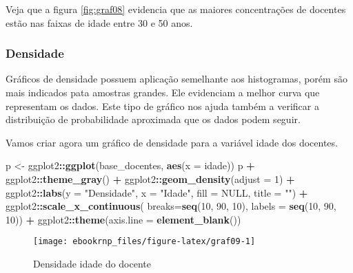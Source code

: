 \documentclass[11pt,]{style/krantz}
\makeatletter
\newenvironment{Shaded}{\begin{snugshade}}{\end{snugshade}}
\newcommand{\DataTypeTok}[1]{\textcolor[rgb]{0.13,0.29,0.53}{#1}}
\newcommand{\DecValTok}[1]{\textcolor[rgb]{0.00,0.00,0.81}{#1}}
\newcommand{\KeywordTok}[1]{\textcolor[rgb]{0.13,0.29,0.53}{\textbf{#1}}}
\newcommand{\NormalTok}[1]{#1}
\newcommand{\OperatorTok}[1]{\textcolor[rgb]{0.81,0.36,0.00}{\textbf{#1}}}
\newcommand{\OtherTok}[1]{\textcolor[rgb]{0.56,0.35,0.01}{#1}}
\newcommand{\StringTok}[1]{\textcolor[rgb]{0.31,0.60,0.02}{#1}}
\newenvironment{kframe}{%
\medskip{}
\setlength{\fboxsep}{.8em}
 \def\at@end@of@kframe{}%
 \ifinner\ifhmode%
  \def\at@end@of@kframe{\end{minipage}}%
  \begin{minipage}{\columnwidth}%
 \fi\fi%
 \def\FrameCommand##1{\hskip\@totalleftmargin \hskip-\fboxsep
 \colorbox{shadecolor}{##1}\hskip-\fboxsep
     \hskip-\linewidth \hskip-\@totalleftmargin \hskip\columnwidth}%
 \MakeFramed {\advance\hsize-\width
   \@totalleftmargin\z@ \linewidth\hsize
   \@setminipage}}%
 {\par\unskip\endMakeFramed%
 \at@end@of@kframe}
\renewenvironment{Shaded}{\begin{kframe}}{\end{kframe}}
\theoremstyle{definition}
\theoremstyle{definition}
\theoremstyle{definition}
\theoremstyle{remark}
\let\BeginKnitrBlock\begin \let\EndKnitrBlock\end
\makeatother
\begin{document}
Veja que a figura \ref{fig:graf08} evidencia que as maiores concentrações de docentes estão nas faixas de idade entre 30 e 50 anos.

\hypertarget{densidade}{%
\subsubsection{Densidade}\label{densidade}}

Gráficos de densidade possuem aplicação semelhante aos histogramas, porém são mais indicados pata amostras grandes. Ele evidenciam a melhor curva que representam os dados. Este tipo de gráfico nos ajuda também a verificar a distribuição de probabilidade aproximada que os dados podem seguir.

\BeginKnitrBlock{example}
\protect\hypertarget{exm:unnamed-chunk-77}{}{\label{exm:unnamed-chunk-77} }Vamos criar agora um gráfico de densidade para a variável idade dos docentes.
\EndKnitrBlock{example}

\begin{Shaded}
\begin{Highlighting}[]
\NormalTok{p <-}\StringTok{ }\NormalTok{ggplot2}\OperatorTok{::}\KeywordTok{ggplot}\NormalTok{(base_docentes, }\KeywordTok{aes}\NormalTok{(}\DataTypeTok{x =}\NormalTok{ idade))}
\NormalTok{p }\OperatorTok{+}\StringTok{ }\NormalTok{ggplot2}\OperatorTok{::}\KeywordTok{theme_gray}\NormalTok{() }\OperatorTok{+}
\StringTok{  }\NormalTok{ggplot2}\OperatorTok{::}\KeywordTok{geom_density}\NormalTok{(}\DataTypeTok{adjust =} \DecValTok{1}\NormalTok{) }\OperatorTok{+}
\StringTok{  }\NormalTok{ggplot2}\OperatorTok{::}\KeywordTok{labs}\NormalTok{(}\DataTypeTok{y =} \StringTok{"Densidade"}\NormalTok{, }\DataTypeTok{x =} \StringTok{"Idade"}\NormalTok{, }\DataTypeTok{fill =} \OtherTok{NULL}\NormalTok{, }\DataTypeTok{title =} \StringTok{""}\NormalTok{) }\OperatorTok{+}
\StringTok{  }\NormalTok{ggplot2}\OperatorTok{::}\KeywordTok{scale_x_continuous}\NormalTok{(}
    \DataTypeTok{breaks=}\KeywordTok{seq}\NormalTok{(}\DecValTok{10}\NormalTok{, }\DecValTok{90}\NormalTok{, }\DecValTok{10}\NormalTok{),}
    \DataTypeTok{labels =} \KeywordTok{seq}\NormalTok{(}\DecValTok{10}\NormalTok{, }\DecValTok{90}\NormalTok{, }\DecValTok{10}\NormalTok{)) }\OperatorTok{+}
\StringTok{  }\NormalTok{ggplot2}\OperatorTok{::}\KeywordTok{theme}\NormalTok{(}\DataTypeTok{axis.line =} \KeywordTok{element_blank}\NormalTok{())}
\end{Highlighting}
\end{Shaded}

\begin{figure}[H]

{\centering \texttt{[image: ebookrnp\_files/figure-latex/graf09-1]}

}

\caption{Densidade idade do docente}\label{fig:graf09}
\end{figure}
\end{document}
